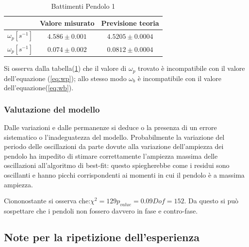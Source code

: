 \documentclass{article}
\begin{document}
                \begin{table}[h! ]
                    \centering
                    \caption{Battimenti Pendolo 1}
                    \begin{tabular}{|c|c|c|}
                    \hline
                     & Valore misurato & Previsione teoria\\
                    \hline
                    $\omega_p [s^{-1}]$ & $4.586 \pm 0.001$& $4.5205 \pm 0.0004$\\
                    $\omega_p [s^{-1}]$ & $0.074 \pm 0.002$& $0.0812 \pm 0.0004$\\

                   
                    \hline
                    
                    \end{tabular}
                    \label{tab:pb2}
                \end{table}


            Si osserva dalla tabella(\ref{tab:pb2}) che il valore di $\omega_p$ trovato è incompatibile con il valore dell'equazione (\ref{eq:wp}); allo stesso modo $\omega_b$ è incompatibile con il valore dell'equazione(\ref{eq:wb}).
            

            \subsubsection{Valutazione del modello}
          
            Dalle variazioni e dalle permanenze si deduce o la presenza di un errore sistematico o l'inadeguatezza del modello. Probabilmente la variazione del periodo delle oscillazioni da parte dovute alla variazione dell'ampiezza dei pendolo ha impedito di stimare correttamente l'ampiezza massima delle oscillazioni all'algoritmo di best-fit: questo spiegherebbe come i residui sono oscillanti e hanno picchi corrispondenti ai momenti in cui il pendolo è a massima ampiezza.

            Ciononostante si osserva che:$\chi^2= 129 p_{value}= 0.09 Dof= 152$. Da questo si può sospettare che i pendoli non fossero davvero in fase e contro-fase.


            
                      
\subsection{Note per la ripetizione dell'esperienza}
\end{document}
